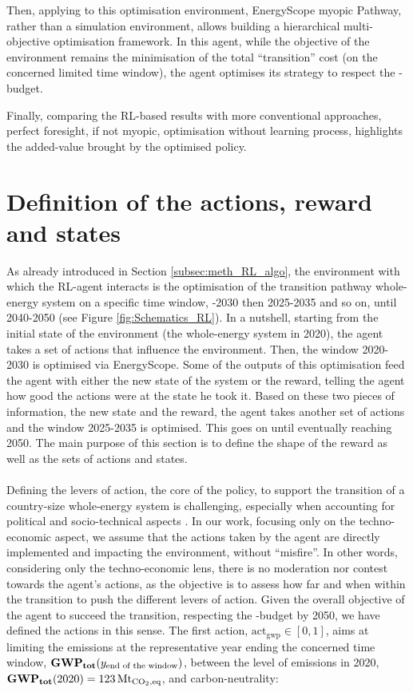 Then, applying to this optimisation environment, \ie EnergyScope myopic Pathway,  rather than a simulation environment, allows building a hierarchical multi-objective optimisation framework. In this agent, while the objective of the environment remains the minimisation of the total ``transition'' cost (on the concerned limited time window), the agent optimises its strategy to respect the -budget. 

Finally, comparing the \gls{RL}-based results with more conventional approaches, \ie perfect foresight, if not myopic, optimisation without learning process, highlights the added-value brought by the optimised policy.


\section{Definition of the actions, reward and states}
\label{sec:RL:act_states_rew}
As already introduced in Section \ref{subsec:meth_RL_algo}, the environment with which the \gls{RL}-agent interacts is the optimisation of the transition pathway whole-energy system on a specific time window, -2030 then 2025-2035 and so on, until 2040-2050 (see Figure \ref{fig:Schematics_RL}). In a nutshell, starting from the initial state of the environment (\ie the whole-energy system in 2020), the agent takes a set of actions that influence the environment. Then, the window 2020-2030 is optimised via EnergyScope. Some of the outputs of this optimisation feed the agent with either the new state of the system or the reward, \ie telling the agent how good the actions were at the state he took it. Based on these two pieces of information, \ie the new state and the reward, the agent takes another set of actions and the window 2025-2035 is optimised. This goes on until eventually reaching 2050.  The main purpose of this section is to define the shape of the reward as well as the sets of actions and states.\\


\\

\noindent
Defining the levers of action, the core of the policy, to support the transition of a country-size whole-energy system is challenging, especially when accounting for political and socio-technical aspects \cite{castrejon2020making}. In our work, focusing only on the techno-economic aspect, we assume that the actions taken by the agent are directly implemented and impacting the environment, without ``misfire''. In other words, considering only the techno-economic lens, there is no moderation nor contest towards the agent's actions, as the objective is to assess how far and when within the transition to push the different levers of action. Given the overall objective of the agent to succeed the transition, \ie respecting the -budget by 2050, we have defined the actions in this sense. The first action, $\mathrm{act}_{\mathrm{gwp}} \in [0,1]$, aims at limiting the emissions at the representative year ending the concerned time window, $\textbf{GWP\textsubscript{tot}}(y_{\text{end of the window}})$, between the level of emissions in 2020, \ie $\textbf{GWP\textsubscript{tot}}(2020)=123\,\text{Mt}_{\ce{CO2},\text{eq}}$, and carbon-neutrality:

